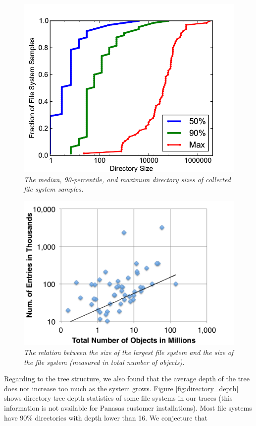 \begin{figure}[hb]
\center
\includegraphics[scale=0.5]{figs/directory_size}
\caption{\textit{The median, 90-percentile,
and maximum directory sizes of collected file system samples.
}}
\label{fig:directory_size}
\end{figure}

\begin{figure}[!ht]
\center
\includegraphics[scale=0.4]{figs/large_dir}
\caption{\textit{The relation between the size of the largest file system
and the size of the file system (measured in total number of objects).}}
\label{fig:large_directory}
\end{figure}

Regarding to the tree structure, we also found that the average depth
of the tree does not increase too much as the system grows.
Figure \ref{fig:directory_depth} shows directory tree
depth statistics of some file systems in our traces
(this information is not available for Panasas customer installations).
Most file systems have 90\% directories with depth lower than 16.
We conjecture that

